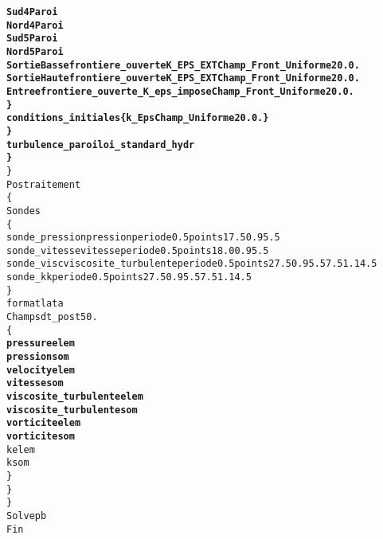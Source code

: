 \begin{alltt}
                     {\bf{Sud4 Paroi  }}
                     {\bf{Nord4 Paroi  }}
                     {\bf{Sud5 Paroi  }}
                     {\bf{Nord5 Paroi  }}
                     {\bf{SortieBasse frontiere_ouverte K_EPS_EXT Champ_Front_Uniforme 2 0. 0.  }}
                     {\bf{SortieHaute frontiere_ouverte K_EPS_EXT Champ_Front_Uniforme 2 0. 0.  }}
                     {\bf{Entree frontiere_ouverte_K_eps_impose Champ_Front_Uniforme 2 0. 0.  }}
                {\bf{\} }}
                {\bf{conditions_initiales \{     k_Eps Champ_Uniforme 2 0. 0. \}  }}
            {\bf{\} }}
            {\bf{turbulence_paroi loi_standard_hydr  }}
        {\bf{\} }}
    \}
    Postraitement 
    \{
        Sondes 
        \{
            sonde_pression pression periode 0.5 points 1 7.5 0.9 5.5
            sonde_vitesse vitesse periode 0.5 points 1 8.0 0.9 5.5
            sonde_visc viscosite_turbulente periode 0.5 points 2 7.5 0.9 5.5 7.5 1.1 4.5
            sonde_k k periode 0.5 points 2 7.5 0.9 5.5 7.5 1.1 4.5
        \}
                format lata
        Champs dt_post 50.
        \{
            {\bf{pressure elem}}
            {\bf{pression som}}
            {\bf{velocity elem}}
            {\bf{vitesse som}}
            {\bf{viscosite_turbulente elem}}
            {\bf{viscosite_turbulente som}}
            {\bf{vorticite elem}}
            {\bf{vorticite som}}
            k elem
            k som
        \}
    \}
\}
Solve pb
Fin
\end{alltt}
